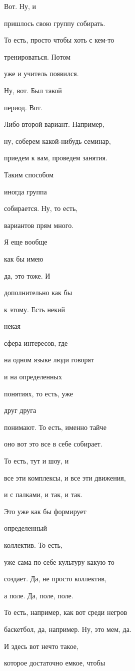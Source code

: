 Вот. Ну, и

пришлось свою группу собирать.

То есть, просто чтобы хоть с кем-то

тренироваться. Потом

уже и учитель появился.

Ну, вот. Был такой

период. Вот.

Либо второй вариант. Например,

ну, соберем какой-нибудь семинар,

приедем к вам, проведем занятия.

Таким способом

иногда группа

собирается. Ну, то есть,

вариантов прям много.

Я еще вообще

как бы имею

да, это тоже. И

дополнительно как бы

к этому. Есть некий

некая

сфера интересов, где

на одном языке люди говорят

и на определенных

понятиях, то есть, уже

друг друга

понимают. То есть, именно тайче

оно вот это все в себе собирает.

То есть, тут и шоу, и

все эти комплексы, и все эти движения,

и с палками, и так, и так.

Это уже как бы формирует

определенный

коллектив. То есть,

уже сама по себе культуру какую-то

создает. Да, не просто коллектив,

а поле. Да, поле, поле.

То есть, например, как вот среди негров

баскетбол, да, например. Ну, это мем, да.

И здесь вот нечто такое,

которое достаточно емкое, чтобы

